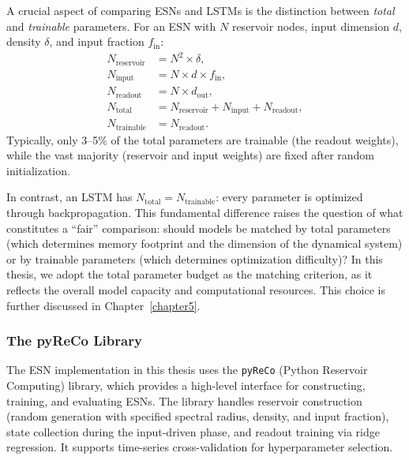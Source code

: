 A crucial aspect of comparing ESNs and LSTMs is the distinction between \emph{total} and \emph{trainable} parameters. For an ESN with $N$ reservoir nodes, input dimension $d$, density $\delta$, and input fraction $f_{\text{in}}$:
\begin{align}
    N_{\text{reservoir}} &= N^2 \times \delta, \label{eq:esn_reservoir} \\
    N_{\text{input}} &= N \times d \times f_{\text{in}}, \label{eq:esn_input} \\
    N_{\text{readout}} &= N \times d_{\text{out}}, \label{eq:esn_readout} \\
    N_{\text{total}} &= N_{\text{reservoir}} + N_{\text{input}} + N_{\text{readout}}, \label{eq:esn_total} \\
    N_{\text{trainable}} &= N_{\text{readout}}. \label{eq:esn_trainable}
\end{align}
Typically, only 3--5\% of the total parameters are trainable (the readout weights), while the vast majority (reservoir and input weights) are fixed after random initialization.

In contrast, an LSTM has $N_{\text{total}} = N_{\text{trainable}}$: every parameter is optimized through backpropagation. This fundamental difference raises the question of what constitutes a ``fair'' comparison: should models be matched by total parameters (which determines memory footprint and the dimension of the dynamical system) or by trainable parameters (which determines optimization difficulty)? In this thesis, we adopt the total parameter budget as the matching criterion, as it reflects the overall model capacity and computational resources. This choice is further discussed in Chapter~\ref{chapter5}.

\subsubsection{The pyReCo Library}

The ESN implementation in this thesis uses the \texttt{pyReCo} (Python Reservoir Computing) library, which provides a high-level interface for constructing, training, and evaluating ESNs. The library handles reservoir construction (random generation with specified spectral radius, density, and input fraction), state collection during the input-driven phase, and readout training via ridge regression. It supports time-series cross-validation for hyperparameter selection.

